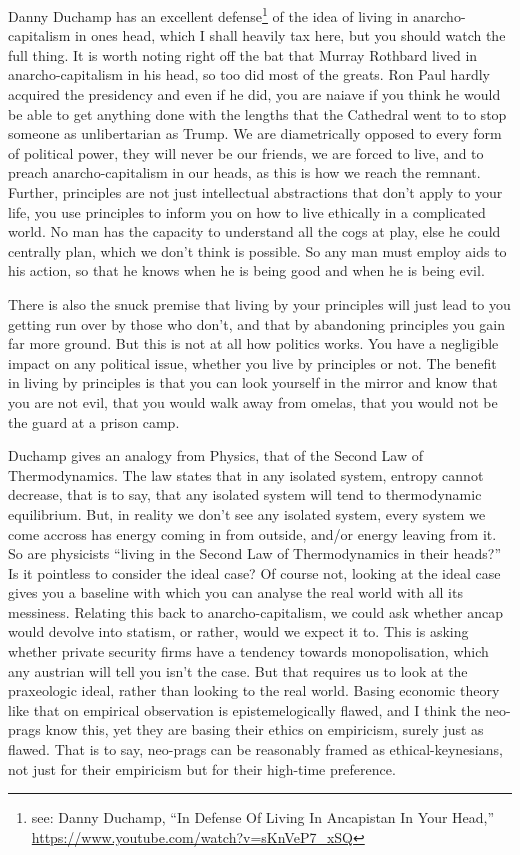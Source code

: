 \documentclass[11pt]{article}
\begin{document}
Danny Duchamp has an excellent defense\footnote{see: Danny Duchamp, ``In Defense Of Living In Ancapistan In Your Head,'' \url{https://www.youtube.com/watch?v=sKnVeP7\_xSQ}} of the idea of living in anarcho-capitalism in ones head, which I shall heavily tax here, but you should watch the full thing. It is worth noting right off the bat that Murray Rothbard lived in anarcho-capitalism in his head, so too did most of the greats. Ron Paul hardly acquired the presidency and even if he did, you are naiave if you think he would be able to get anything done with the lengths that the Cathedral went to to stop someone as unlibertarian as Trump. We are diametrically opposed to every form of political power, they will never be our friends, we are forced to live, and to preach anarcho-capitalism in our heads, as this is how we reach the remnant. Further, principles are not just intellectual abstractions that don't apply to your life, you use principles to inform you on how to live ethically in a complicated world. No man has the capacity to understand all the cogs at play, else he could centrally plan, which we don't think is possible. So any man must employ aids to his action, so that he knows when he is being good and when he is being evil.

There is also the snuck premise that living by your principles will just lead to you getting run over by those who don't, and that by abandoning principles you gain far more ground. But this is not at all how politics works. You have a negligible impact on any political issue, whether you live by principles or not. The benefit in living by principles is that you can look yourself in the mirror and know that you are not evil, that you would walk away from omelas, that you would not be the guard at a prison camp.

Duchamp gives an analogy from Physics, that of the Second Law of Thermodynamics. The law states that in any isolated system, entropy cannot decrease, that is to say, that any isolated system will tend to thermodynamic equilibrium. But, in reality we don't see any isolated system, every system we come accross has energy coming in from outside, and/or energy leaving from it. So are physicists ``living in the Second Law of Thermodynamics in their heads?'' Is it pointless to consider the ideal case? Of course not, looking at the ideal case gives you a baseline with which you can analyse the real world with all its messiness. Relating this back to anarcho-capitalism, we could ask whether ancap would devolve into statism, or rather, would we expect it to. This is asking whether private security firms have a tendency towards monopolisation, which any austrian will tell you isn't the case. But that requires us to look at the praxeologic ideal, rather than looking to the real world. Basing economic theory like that on empirical observation is epistemelogically flawed, and I think the neo-prags know this, yet they are basing their ethics on empiricism, surely just as flawed. That is to say, neo-prags can be reasonably framed as ethical-keynesians, not just for their empiricism but for their high-time preference.
\end{document}
